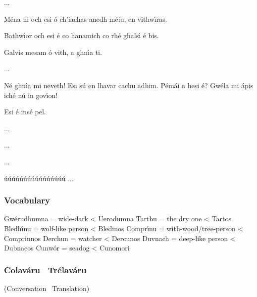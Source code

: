 \begin{leftbubbles}...\end{leftbubbles}
\begin{rightbubbles}M\'{e}na ni och esi \'{o} ch’iachas anedh m\'{e}iu, en vithw\'{\i}ras.\end{rightbubbles}
\begin{rightbubbles}Bathw\'{\i}or och esi \'{e} co hanamich co rh\'{e} ghals\'{\i} \'{e} bis.\end{rightbubbles}
\begin{rightbubbles}Galvis mesam \'{o} vith, a ghn\'{\i}a ti.\end{rightbubbles}
\begin{rightbubbles}...\end{rightbubbles}
\begin{leftbubbles}N\'{e} ghn\'{\i}a mi neveth! Esi s\'{u} en lhavar cachu adhim. P\'{e}m\'{a}i a hesi \'{e}? Gw\'{e}la mi \'{a}pis ich\'{e} n\'{u} in gov\'{\i}on!\end{leftbubbles}
\begin{rightbubbles}Esi \'{e} ins\'{e} pel.\end{rightbubbles}
\begin{rightbubbles}...\end{rightbubbles}
\begin{rightbubbles}...\end{rightbubbles}
\begin{rightbubbles}...\end{rightbubbles}
\begin{rightbubbles}\'{u}\'{u}\'{u}\'{u}\'{u}\'{u}\'{u}\'{u}\'{u}\'{u}\'{u}\'{u}\'{u}\'{u}\'{u}\'{u} ...\end{rightbubbles}
\endgroup

\newpage
\subsubsection{Vocabulary}

Gw\'{e}rudhumna = wide-dark < Uerodumna
Tarthu = the dry one < Tartos
Bledh\'{\i}nu = wolf-like person < Bledinos
Compr\'{\i}nu = with-wood/tree-person < Comprinnos
Derchun = watcher < Dercunos
Duvnach = deep-like person < Dubnacos
Cunw\'{o}r = seadog < Cunomori

\subsubsection{Colav\'{a}ru \textendash\ Tr\'{e}lav\'{a}ru}
(Conversation \textendash\ Translation)

